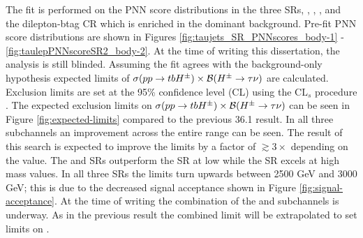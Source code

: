 		The fit is performed on the \gls{PNN} score distributions in the three \glspl{SR}, \taujets, \tauel, \taumu, and the dilepton-btag \gls{CR} which is enriched in the dominant \ttbar background. Pre-fit \gls{PNN} score distributions are shown in Figures \ref{fig:taujets_SR_PNNscores_body-1} - \ref{fig:taulepPNNscoreSR2_body-2}. At the time of writing this dissertation, the analysis is still blinded. Assuming the fit agrees with the background-only hypothesis expected limits of $\sigma(pp \to tbH^{\pm})\times \mathrm{\cal{B}}(H^{\pm} \to \tau \nu)$ are calculated. Exclusion limits are set at the 95\% confidence level (CL) using the $\mathrm{CL}_s$ procedure \cite{CL-setting}. The expected exclusion limits on $\sigma(pp \to tbH^{\pm})\times \mathrm{\cal{B}}(H^{\pm} \to \tau \nu)$ can be seen in Figure \ref{fig:expected-limits} compared to the previous 36.1 \ifb result. In all three subchannels an improvement across the entire \mHpm range can be seen. The result of this search is expected to improve the limits by a factor of $\gtrsim 3 \times$ depending on the \mHpm value. The \tauel and \taumu \glspl{SR} outperform the \taujets \gls{SR} at low \mHpm while the \taujets \gls{SR} excels at high mass values. In all three \glspl{SR} the limits turn upwards between 2500 GeV and 3000 GeV; this is due to the decreased signal acceptance shown in Figure \ref{fig:signal-acceptance}. At the time of writing the combination of the \taulep and \taujets subchannels is underway. As in the previous result \cite{hpm-previous} the combined limit will be extrapolated to set limits on \tanb.

